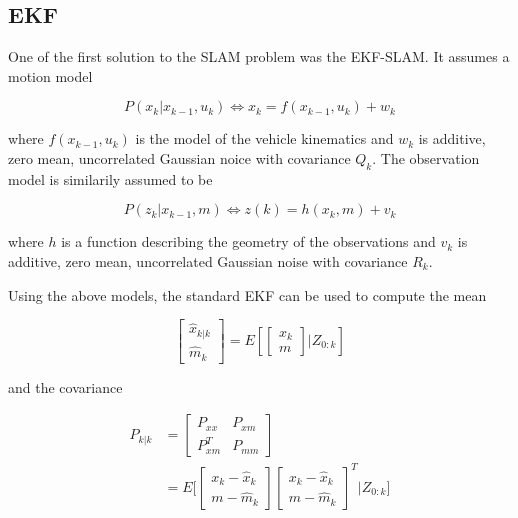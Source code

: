 \subsection{EKF}

One of the first solution to the SLAM problem was the EKF-SLAM\cite{EKFSLAM}. It assumes a motion model 

\begin{equation}
    P(x_k|x_{k-1},u_k) \iff  x_k = f(x_{k-1},u_k) + w_k
\end{equation}

where $f(x_{k-1},u_k)$ is the model of the vehicle kinematics and $w_k$ is additive, zero mean, uncorrelated Gaussian noice with covariance $Q_k$. The observation model is similarily assumed to be 

\begin{equation}
    P(z_k|x_{k-1},m) \iff  z(k) = h(x_{k},m) + v_k
\end{equation}

where $h$ is a function describing the geometry of the observations and $v_k$ is additive, zero mean, uncorrelated Gaussian noise with covariance $R_k$. 

Using the above models, the standard EKF can be used to compute the mean 

\begin{equation}
    \begin{bmatrix} \hat{x}_{k|k} \\ \hat{m}_k \end{bmatrix} = E[\begin{bmatrix} x_k \\ m \end{bmatrix} | Z_{0:k}]
\end{equation}

and the covariance

\begin{align}
    P_{k|k} &= \begin{bmatrix} P_{xx} & P_{xm} \\ P^T_{xm} & P_{mm} \end{bmatrix} \\
     &= E\bigg[\begin{bmatrix} x_k-\hat{x}_k \\ m - \hat{m}_k\end{bmatrix}\begin{bmatrix} x_k-\hat{x}_k \\ m - \hat{m}_k\end{bmatrix}^T \bigg| Z_{0:k} \bigg]
\end{align}

